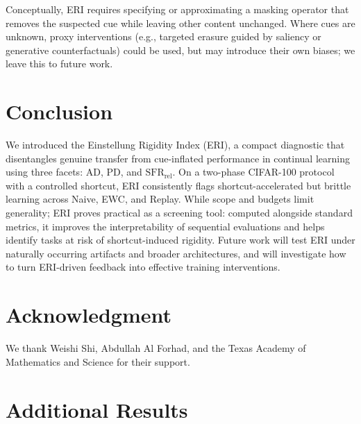 \documentclass[conference]{IEEEtran}
\begin{document}
Conceptually, ERI requires specifying or approximating a masking operator that removes the suspected cue while leaving other content unchanged. Where cues are unknown, proxy interventions (e.g., targeted erasure guided by saliency or generative counterfactuals) could be used, but may introduce their own biases; we leave this to future work.

\section{Conclusion}
We introduced the Einstellung Rigidity Index (ERI), a compact diagnostic that disentangles genuine transfer from cue-inflated performance in continual learning using three facets: \(\mathrm{AD}\), \(\mathrm{PD}\), and \(\mathrm{SFR}_{\mathrm{rel}}\). On a two-phase CIFAR-100 protocol with a controlled shortcut, ERI consistently flags shortcut-accelerated but brittle learning across Naive, EWC, and Replay. While scope and budgets limit generality; ERI proves practical as a screening tool: computed alongside standard metrics, it improves the interpretability of sequential evaluations and helps identify tasks at risk of shortcut-induced rigidity. Future work will test ERI under naturally occurring artifacts and broader architectures, and will investigate how to turn ERI-driven feedback into effective training interventions.

\section*{Acknowledgment}
We thank Weishi Shi, Abdullah Al Forhad, and the Texas Academy of Mathematics and Science for their support.

\appendices
\section{Additional Results}
\end{document}
